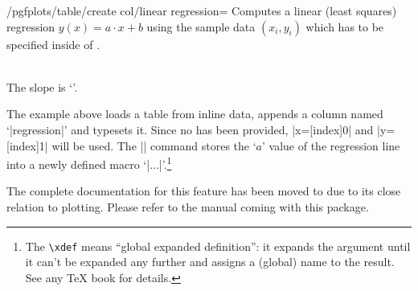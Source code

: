 \begin{stylekey}{/pgfplots/table/create col/linear regression=}
    Computes a linear (least squares) regression $y(x) = a \cdot x + b$ using
    the sample data $(x_i,y_i)$ which has to be specified inside of
    .
\begin{codeexample}[pre={\begin{lateximage}\vbox\bgroup\hsize=3cm},post={\egroup\end{lateximage}}]
\loadedtbl

    {\loadedtbl}
\xdef\slope{\pgfplotstableregressiona}

\pgfplotstabletypeset\loadedtbl\\

The slope is `\slope'.
\end{codeexample}
    \noindent The example above loads a table from inline data, appends a
    column named `|regression|' and typesets it. Since no
     has been provided, |x=[index]0| and |y=[index]1|
    will be used. The |\xdef\slope{...}| command stores the `$a$' value of the
    regression line into a newly defined macro `|\slope|'.\footnote{The
    \texttt{\textbackslash xdef} means ``global expanded definition'': it
    expands the argument until it can't be expanded any further and assigns a
    (global) name to the result. See any \TeX{} book for details.}

    The complete documentation for this feature has been moved to \PGFPlots{}
    due to its close relation to plotting. Please refer to the \PGFPlots{}
    manual coming with this package.
\end{stylekey}

